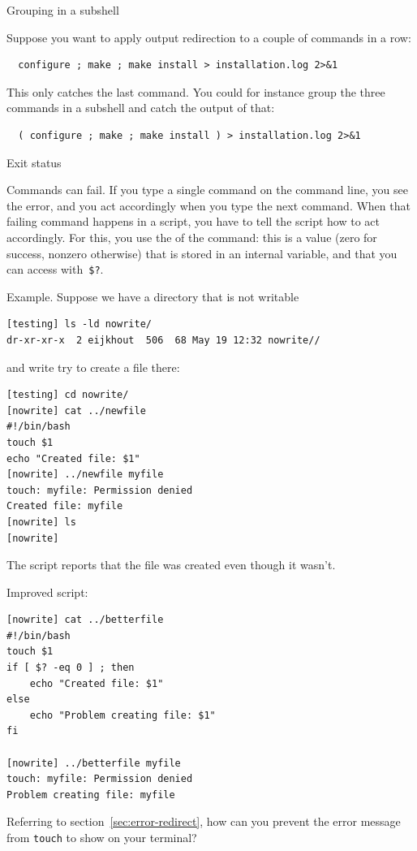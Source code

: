  {Grouping in a subshell}

Suppose you want to apply output redirection to a couple of commands
in a row:
\begin{lstlisting}
  configure ; make ; make install > installation.log 2>&1
\end{lstlisting}
This only catches the last command. You could for instance group the
three commands in a subshell and catch the output of that:
\begin{lstlisting}
  ( configure ; make ; make install ) > installation.log 2>&1
\end{lstlisting}

 {Exit status}

Commands can fail. If you type a single command on the command line,
you see the error, and you act accordingly when you type the next
command. When that failing command happens in a script, you have to
tell the script how to act accordingly. For this, you use the
 of the command: this is a value (zero for
success, nonzero otherwise) that is stored in an internal variable,
and that you can access with~\verb+$?+.

Example. Suppose we have a directory that is not writable
\begin{lstlisting}
[testing] ls -ld nowrite/
dr-xr-xr-x  2 eijkhout  506  68 May 19 12:32 nowrite//
\end{lstlisting}
and write try to create a file there:
\begin{lstlisting}
[testing] cd nowrite/
[nowrite] cat ../newfile 
#!/bin/bash
touch $1
echo "Created file: $1"
[nowrite] ../newfile myfile
touch: myfile: Permission denied
Created file: myfile
[nowrite] ls
[nowrite]
\end{lstlisting}
The script reports that the file was created even though it wasn't.

Improved script:
\begin{lstlisting}
[nowrite] cat ../betterfile
#!/bin/bash
touch $1
if [ $? -eq 0 ] ; then
    echo "Created file: $1"
else
    echo "Problem creating file: $1"
fi

[nowrite] ../betterfile myfile
touch: myfile: Permission denied
Problem creating file: myfile
\end{lstlisting}

\begin{exercise}
  Referring to section~\ref{sec:error-redirect},
  how can you prevent the error message from \lstinline{touch}
  to show on your terminal?
\end{exercise}

